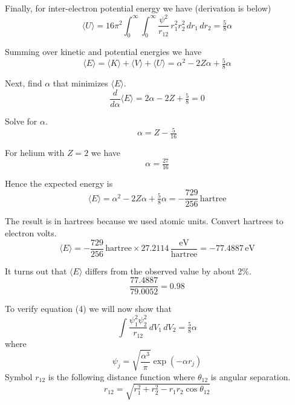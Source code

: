Finally, for inter-electron potential energy we have (derivation is below)
\begin{equation*}
\langle U\rangle
=
16\pi^2\int_0^\infty\int_0^\infty\frac{\psi^2}{r_{12}}
\,r_1^2r_2^2
\,dr_1\,dr_2
=\tfrac{5}{8}\alpha
\tag{4}
\end{equation*}

Summing over kinetic and potential energies we have
\begin{equation*}
\langle E\rangle=\langle K\rangle+\langle V\rangle+\langle U\rangle=\alpha^2-2Z\alpha+\tfrac{5}{8}\alpha
\end{equation*}

Next, find $\alpha$ that minimizes $\langle E\rangle$.
\begin{equation*}
\frac{d}{d\alpha}\langle E\rangle=2\alpha-2Z+\tfrac{5}{8}=0
\end{equation*}

Solve for $\alpha$.
\begin{equation*}
\alpha=Z-\tfrac{5}{16}
\end{equation*}

For helium with $Z=2$ we have
\begin{equation*}
\alpha=\tfrac{27}{16}
\end{equation*}

Hence the expected energy is
\begin{equation*}
\langle E\rangle
=\alpha^2-2Z\alpha+\tfrac{5}{8}\alpha
=-\frac{729}{256}\,\text{hartree}
\end{equation*}

The result is in hartrees because we used atomic units.
Convert hartrees to electron volts.
\begin{equation*}
\langle E\rangle=-\frac{729}{256}\,\text{hartree}\times27.2114\,\frac{\text{eV}}{\text{hartree}}=-77.4887\,\text{eV}
\end{equation*}

It turns out that $\langle E\rangle$ differs from the observed value by about 2\%.
\begin{equation*}
\frac{77.4887}{79.0052}=0.98
\end{equation*}

To verify equation (4) we will now show that
\begin{equation*}
\int\frac{\psi_1^2\psi_2^2}{r_{12}}\,dV_1\,dV_2=\tfrac{5}{8}\alpha
\end{equation*}
where
\begin{equation*}
\psi_j=\sqrt{\frac{\alpha^3}{\pi}}\exp\left(-\alpha r_j\right)
\end{equation*}
Symbol $r_{12}$ is the following distance function where $\theta_{12}$ is angular separation.
\begin{equation*}
r_{12}=\sqrt{r_1^2+r_2^2-r_1r_2\cos\theta_{12}}
\end{equation*}

